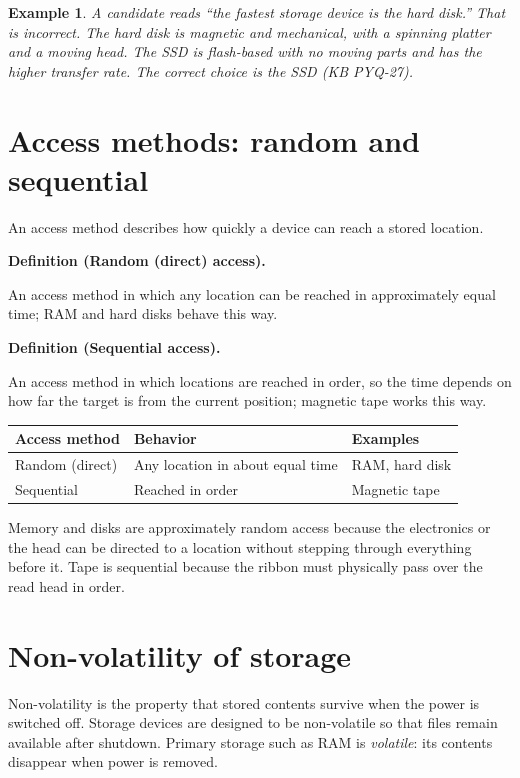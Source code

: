 \documentclass[11pt]{article}
\newtheorem{example}{Example}[section]
\newenvironment{definitionbox}[1]{%
  \par\noindent\textbf{Definition (#1).}\ \itshape
}{\par\vspace{0.3em}}
\begin{document}
\begin{example}
A candidate reads ``the fastest storage device is the hard disk.'' That is
incorrect. The hard disk is magnetic and mechanical, with a spinning platter
and a moving head. The SSD is flash-based with no moving parts and has the
higher transfer rate. The correct choice is the SSD (KB PYQ-27).
\end{example}

\section{Access methods: random and sequential}
An access method describes how quickly a device can reach a stored location.

\begin{definitionbox}{Random (direct) access}
An access method in which any location can be reached in approximately equal
time; RAM and hard disks behave this way.
\end{definitionbox}

\begin{definitionbox}{Sequential access}
An access method in which locations are reached in order, so the time depends
on how far the target is from the current position; magnetic tape works this
way.
\end{definitionbox}

\begin{center}
\begin{tabular}{p{}p{}p{}}
\toprule
\textbf{Access method} & \textbf{Behavior} & \textbf{Examples}\\
\midrule
Random (direct) & Any location in about equal time & RAM, hard disk\\
Sequential & Reached in order & Magnetic tape\\
\bottomrule
\end{tabular}
\end{center}

Memory and disks are approximately random access because the electronics or
the head can be directed to a location without stepping through everything
before it. Tape is sequential because the ribbon must physically pass over the
read head in order.

\section{Non-volatility of storage}
Non-volatility is the property that stored contents survive when the power is
switched off. Storage devices are designed to be non-volatile so that files
remain available after shutdown. Primary storage such as RAM is
\emph{volatile}: its contents disappear when power is removed.
\end{document}

